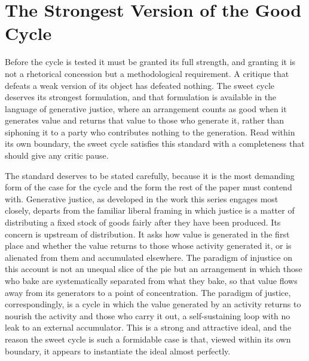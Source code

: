 \documentclass[11pt,a4paper]{article}
\begin{document}
\section{The Strongest Version of the Good Cycle}

Before the cycle is tested it must be granted its full strength, and granting it is not a rhetorical concession but a methodological requirement. A critique that defeats a weak version of its object has defeated nothing. The sweet cycle deserves its strongest formulation, and that formulation is available in the language of generative justice, where an arrangement counts as good when it generates value and returns that value to those who generate it, rather than siphoning it to a party who contributes nothing to the generation. Read within its own boundary, the sweet cycle satisfies this standard with a completeness that should give any critic pause.

The standard deserves to be stated carefully, because it is the most demanding form of the case for the cycle and the form the rest of the paper must contend with. Generative justice, as developed in the work this series engages most closely, departs from the familiar liberal framing in which justice is a matter of distributing a fixed stock of goods fairly after they have been produced. Its concern is upstream of distribution. It asks how value is generated in the first place and whether the value returns to those whose activity generated it, or is alienated from them and accumulated elsewhere. The paradigm of injustice on this account is not an unequal slice of the pie but an arrangement in which those who bake are systematically separated from what they bake, so that value flows away from its generators to a point of concentration. The paradigm of justice, correspondingly, is a cycle in which the value generated by an activity returns to nourish the activity and those who carry it out, a self-sustaining loop with no leak to an external accumulator. This is a strong and attractive ideal, and the reason the sweet cycle is such a formidable case is that, viewed within its own boundary, it appears to instantiate the ideal almost perfectly.
\end{document}

